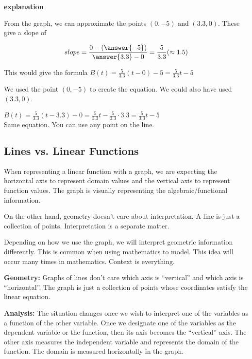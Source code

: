 \documentclass{ximera}
\begin{document}
\begin{example}
\textbf{\textcolor{red!75!green}{explanation}} 


From the graph, we can approximate the points $(0, -5)$ and $(3.3, 0)$.  These give a slope of

\[  slope = \frac{0 - \left(\answer{-5}\right)}{\answer{3.3} - 0} = \frac{5}{3.3} (\approx 1.5)     \]


This would give the formula $B(t) = \frac{5}{3.3} (t - 0) - 5 = \frac{5}{3.3} t - 5$



\end{example}


We used the point $(0, -5)$ to create the equation.  We could also have used $(3.3,0)$.



$B(t) = \frac{5}{3.3} (t - 3.3) - 0 = \frac{5}{3.3} t - \frac{5}{3.3}\cdot 3.3 = \frac{5}{3.3} t -  5$ \\


Same equation.  You can use any point on the line.









\subsection*{Lines vs. Linear Functions}


When representing a linear function with a graph, we are expecting the horizontal axis to represent domain values and the vertical axis to represent function values. The graph is visually representing the algebraic/functional information. 



On the other hand, geometry doesn't care about interpretation. A line is just a collection of points. Interpretation is a separate matter.


Depending on how we use the graph, we will interpret geometric information differently.  This is common when using mathematics to model. This idea will occur many times in mathematics. Context is everything.


\textbf{\textcolor{purple!85!blue}{Geometry:}} Graphs of lines don't care which axis is ``vertical'' and which axis is ``horizontal''.  The graph is just a collection of points whose coordinates satisfy the linear equation.  

\textbf{\textcolor{purple!85!blue}{Analysis:}} The situation changes once we wish to interpret one of the variables as a function of the other variable. Once we designate one of the variables as the dependent variable or the function, then its axis becomes the ``vertical'' axis.  The other axis measures the independent variable and represents the domain of the function. The domain is measured horizontally in the graph. 
\end{document}
